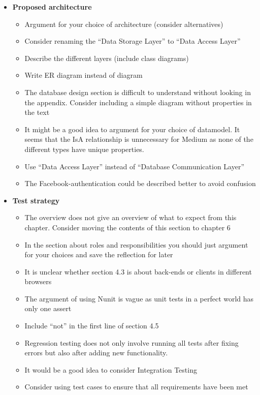 \documentclass[]{article}
\begin{document}
\begin{itemize}
\item \textbf{Proposed architecture}
	\begin{itemize}
	\item Argument for your choice of architecture (consider alternatives)
	\item Consider renaming the ``Data Storage Layer'' to ``Data Access Layer''
	\item Describe the different layers (include class diagrams)
	\item Write ER diagram instead of diagram
	\item The database design section is difficult to understand without looking in the appendix. Consider including a simple diagram without properties in the text
	\item It might be a good idea to argument for your choice of datamodel. It seems that the IsA relationship is unnecessary for Medium as none of the different types have unique properties.
	\item Use ``Data Access Layer'' instead of ``Database Communication Layer''
	\item The Facebook-authentication could be described better to avoid confusion
	\end{itemize}

\item \textbf{Test strategy}
	\begin{itemize}
	\item The overview does not give an overview of what to expect from this chapter. Consider moving the contents of this section to chapter 6
	\item In the section about roles and responsibilities you should just argument for your choices and save the reflection for later
	\item It is unclear whether section 4.3 is about back-ends or clients in different browsers
	\item The argument of using Nunit is vague as unit tests in a perfect world has only one assert
	\item Include ``not'' in the first line of section 4.5
	\item Regression testing does not only involve running all tests after fixing errors but also after adding new functionality.
	\item It would be a good idea to consider Integration Testing
	\item Consider using test cases to ensure that all requirements have been met
	\end{itemize}


\end{itemize}
\end{document}
